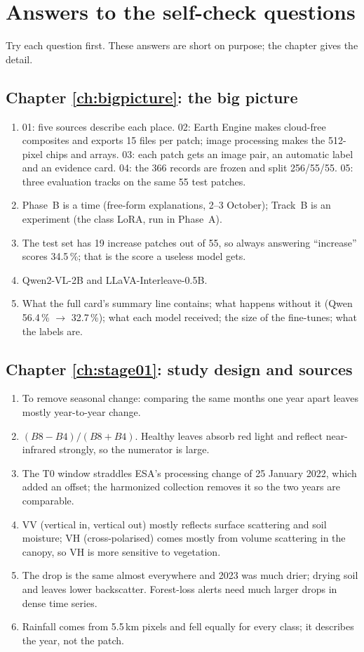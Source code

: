 \chapter{Answers to the self-check questions}
\label{app:answers}

Try each question first. These answers are short on purpose; the chapter gives the detail.

\section*{Chapter \ref{ch:bigpicture}: the big picture}
\begin{enumerate}
  \item 01: five sources describe each place. 02: Earth Engine makes cloud-free composites and exports 15 files per patch; image processing makes the 512-pixel chips and arrays. 03: each patch gets an image pair, an automatic label and an evidence card. 04: the 366 records are frozen and split 256/55/55. 05: three evaluation tracks on the same 55 test patches.
  \item Phase~B is a time (free-form explanations, 2--3 October); Track~B is an experiment (the class LoRA, run in Phase~A).
  \item The test set has 19 increase patches out of 55, so always answering ``increase'' scores 34.5\,\%; that is the score a useless model gets.
  \item Qwen2-VL-2B and LLaVA-Interleave-0.5B.
  \item What the full card's summary line contains; what happens without it (Qwen 56.4\,\% $\rightarrow$ 32.7\,\%); what each model received; the size of the fine-tunes; what the labels are.
\end{enumerate}

\section*{Chapter \ref{ch:stage01}: study design and sources}
\begin{enumerate}
  \item To remove seasonal change: comparing the same months one year apart leaves mostly year-to-year change.
  \item $(B8 - B4)/(B8 + B4)$. Healthy leaves absorb red light and reflect near-infrared strongly, so the numerator is large.
  \item The T0 window straddles ESA's processing change of 25 January 2022, which added an offset; the harmonized collection removes it so the two years are comparable.
  \item VV (vertical in, vertical out) mostly reflects surface scattering and soil moisture; VH (cross-polarised) comes mostly from volume scattering in the canopy, so VH is more sensitive to vegetation.
  \item The drop is the same almost everywhere and 2023 was much drier; drying soil and leaves lower backscatter. Forest-loss alerts need much larger drops in dense time series.
  \item Rainfall comes from 5.5\,km pixels and fell equally for every class; it describes the year, not the patch.
\end{enumerate}

